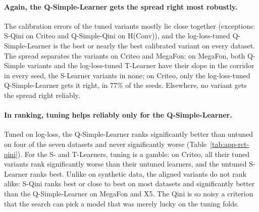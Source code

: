 \documentclass{article}
\begin{document}
\paragraph{Again, the Q-Simple-Learner gets the spread right most robustly.}
The calibration errors of the tuned variants mostly lie close together
(exceptions: S-Qini on Criteo and Q-Simple-Qini on H(Conv)), and the
log-loss-tuned Q-Simple-Learner is the best or nearly the best calibrated
variant on every dataset. The spread separates the variants on Criteo and
MegaFon: on MegaFon, both Q-Simple variants and the log-loss-tuned T-Learner
have their slope in the corridor in every seed, the S-Learner variants in none; on
Criteo, only the log-loss-tuned Q-Simple-Learner gets it right, in $77\%$ of
the seeds.
Elsewhere, no variant gets the spread right reliably.

\paragraph{In ranking, tuning helps reliably only for the Q-Simple-Learner.}
Tuned on log-loss, the Q-Simple-Learner ranks significantly better than
untuned on four of the seven datasets and never significantly worse
(Table~\ref{tab:app-rct-qini}). For the S- and T-Learners, tuning is a
gamble: on Criteo, all their tuned variants rank significantly worse than
their untuned learners, and the untuned S-Learner ranks best. Unlike on
synthetic data, the aligned variants do not rank alike: S-Qini ranks best or
close to best on most datasets and significantly better than the
Q-Simple-Learner on MegaFon and X5. The Qini is so noisy a criterion that the
search can pick a model that was merely lucky on the tuning folds.
\end{document}
